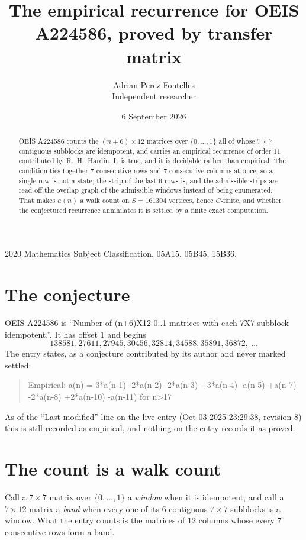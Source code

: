 \documentclass[11pt,a4paper]{article}
\title{The empirical recurrence for OEIS A224586, proved by transfer matrix}
\author{Adrian Perez Fontelles\\ \small Independent researcher}
\date{6 September 2026}
\theoremstyle{plain}
\theoremstyle{definition}
\begin{document}
\maketitle

\begin{abstract}
OEIS A224586 counts the $(n+6)\times12$ matrices over $\{0,\dots,1\}$ all of whose
$7\times7$ contiguous subblocks are idempotent, and carries an empirical recurrence of order
$11$ contributed by R.~H.~Hardin. It is true, and it is decidable rather than empirical.
The condition ties together $7$ consecutive rows and $7$ consecutive columns at once, so a
single row is not a state; the strip of the last $6$ rows is, and the admissible strips
are read off the overlap graph of the admissible windows instead of being enumerated. That
makes $a(n)$ a walk count on $S=161304$ vertices, hence $C$-finite, and whether the conjectured
recurrence annihilates it is settled by a finite exact computation.
\end{abstract}

\noindent\small 2020 Mathematics Subject Classification. 05A15, 05B45, 15B36.\normalsize

\section{The conjecture}

OEIS A224586 is ``Number of (n+6)X12 0..1 matrices with each 7X7 subblock idempotent.''. It has offset $1$ and begins
\[
138581, 27611, 27945, 30456, 32814, 34588, 35891, 36872,\ \dots
\]
The entry states, as a conjecture contributed by its author and never marked settled:
\begin{quote}
Empirical: a(n) = 3*a(n-1) -2*a(n-2) -2*a(n-3) +3*a(n-4) -a(n-5) +a(n-7) -2*a(n-8) +2*a(n-10) -a(n-11) for n>17
\end{quote}
As of the ``Last modified'' line on the live entry (Oct 03 2025 23:29:38, revision 8) this is still
recorded as empirical, and nothing on the entry records it as proved.

\section{The count is a walk count}

Call a $7\times7$ matrix over $\{0,\dots,1\}$ a \emph{window} when it is idempotent, and
call a $7\times12$ matrix a \emph{band} when every one of its $6$ contiguous
$7\times7$ subblocks is a window. What the entry counts is the matrices of $12$ columns
whose every $7$ consecutive rows form a band.
\end{document}
